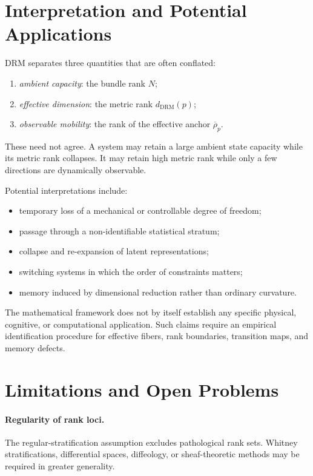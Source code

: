 \documentclass[11pt]{article}
\begin{document}
\section{Interpretation and Potential Applications}

DRM separates three quantities that are often conflated:
\begin{enumerate}
\item \emph{ambient capacity}: the bundle rank $N$;
\item \emph{effective dimension}: the metric rank $d_{\mathrm{DRM}}(p)$;
\item \emph{observable mobility}: the rank of the effective anchor
$\overline\rho_p$.
\end{enumerate}

These need not agree. A system may retain a large ambient state capacity while
its metric rank collapses. It may retain high metric rank while only a few
directions are dynamically observable.

Potential interpretations include:
\begin{itemize}
\item temporary loss of a mechanical or controllable degree of freedom;
\item passage through a non-identifiable statistical stratum;
\item collapse and re-expansion of latent representations;
\item switching systems in which the order of constraints matters;
\item memory induced by dimensional reduction rather than ordinary curvature.
\end{itemize}

The mathematical framework does not by itself establish any specific physical,
cognitive, or computational application. Such claims require an empirical
identification procedure for effective fibers, rank boundaries, transition
maps, and memory defects.

\section{Limitations and Open Problems}
\label{sec:limitations}

\paragraph{Regularity of rank loci.}
The regular-stratification assumption excludes pathological rank sets.
Whitney stratifications, differential spaces, diffeology, or sheaf-theoretic
methods may be required in greater generality.
\end{document}
